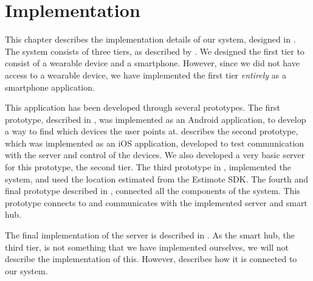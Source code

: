 \chapter{Implementation}\label{chap:implementation}
%
This chapter describes the implementation details of our system, 
designed in . 
The system consists of three tiers, as described by .
We designed the first tier to consist of a wearable device and a smartphone. 
However, since we did not have access to a wearable device, 
we have implemented the first tier \emph{entirely} as a smartphone application. 

This application has been developed through several prototypes. 
The first prototype, described in , 
was implemented as an Android application, 
to develop a way to find which devices the user points at. 
 describes the second prototype, which was implemented as an iOS application,
developed to test communication with the server and control of the devices. 
We also developed a very basic server for this prototype, \ie the second tier. 
The third prototype in , 
implemented the \threedollar system,
and used the location estimated from the Estimote SDK. 
The fourth and final prototype described in , 
connected all the components of the system. 
This prototype connects to and communicates with the implemented server and smart hub. 

The final implementation of the server
is described in . 
As the smart hub, the third tier, is not something that we have implemented ourselves, 
we will not describe the implementation of this.
However,  describes how it is connected to our system. 


\FloatBarrier

\FloatBarrier

\FloatBarrier

\FloatBarrier
